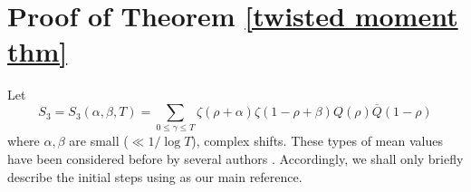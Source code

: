 \documentclass[oneside, 12pt]{amsart}
\theoremstyle{definition}
\newcommand{\leqs}{\leqslant }
\begin{document}







\section{Proof of Theorem \ref{twisted moment thm}}\label{Theorem2Proof}
Let
\begin{equation}
\label{S_3}
  S_3=S_3(\alpha,\beta,T)
        =   \sum_{0\leqs \gamma\leqs T}\zeta(\rho+\alpha)\zeta(1-\rho+\beta)Q(\rho)\overline{Q}(1-\rho)
\end{equation}
where $\alpha,\beta$ are small ($\ll1/\log T$), complex shifts. 
These types of mean values have been considered before by several authors \cite{CGG, CGGSimple, Ng1}. Accordingly, we shall only briefly describe the initial steps using \cite{CGG} as our main reference.
\end{document}
